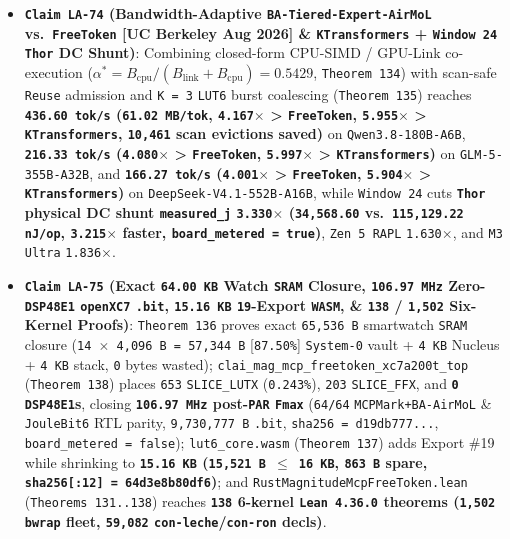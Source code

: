 \documentclass[10pt]{article}
\begin{document}
\begin{itemize}
  \item \textbf{\texttt{Claim LA-74} (Bandwidth-Adaptive \texttt{BA-Tiered-Expert-AirMoL} vs.\ \texttt{FreeToken} [UC Berkeley Aug 2026] \& \texttt{KTransformers} + \texttt{Window 24} \texttt{Thor} DC Shunt)}: Combining closed-form CPU-SIMD / GPU-Link co-execution ($\alpha^* = B_{\text{cpu}} / (B_{\text{link}} + B_{\text{cpu}}) = 0.5429$, \texttt{Theorem 134}) with scan-safe \texttt{Reuse} admission and \texttt{K = 3} \texttt{LUT6} burst coalescing (\texttt{Theorem 135}) reaches \textbf{\texttt{436.60 tok/s} (\texttt{61.02 MB/tok}, \texttt{4.167$\times$} > \texttt{FreeToken}, \texttt{5.955$\times$} > \texttt{KTransformers}, \texttt{10,461} scan evictions saved)} on \texttt{Qwen3.8-180B-A6B}, \textbf{\texttt{216.33 tok/s} (\texttt{4.080$\times$} > \texttt{FreeToken}, \texttt{5.997$\times$} > \texttt{KTransformers})} on \texttt{GLM-5-355B-A32B}, and \textbf{\texttt{166.27 tok/s} (\texttt{4.001$\times$} > \texttt{FreeToken}, \texttt{5.904$\times$} > \texttt{KTransformers})} on \texttt{DeepSeek-V4.1-552B-A16B}, while \texttt{Window 24} cuts \textbf{\texttt{Thor} physical DC shunt \texttt{measured\_j} \texttt{3.330$\times$} (\texttt{34,568.60} vs.\ \texttt{115,129.22 nJ/op}, \texttt{3.215$\times$} faster, \texttt{board\_metered = true})}, \texttt{Zen 5 RAPL} \texttt{1.630$\times$}, and \texttt{M3 Ultra} \texttt{1.836$\times$}.
  \item \textbf{\texttt{Claim LA-75} (Exact \texttt{64.00 KB} Watch \texttt{SRAM} Closure, \texttt{106.97 MHz} Zero-\texttt{DSP48E1} \texttt{openXC7} \texttt{.bit}, \texttt{15.16 KB} \texttt{19}-Export \texttt{WASM}, \& \texttt{138} / \texttt{1,502} Six-Kernel Proofs)}: \texttt{Theorem 136} proves exact \texttt{65,536 B} smartwatch \texttt{SRAM} closure (\texttt{14 $\times$ 4,096 B = 57,344 B} [\texttt{87.50\%}] \texttt{System-0} vault + \texttt{4 KB} Nucleus + \texttt{4 KB} stack, \texttt{0} bytes wasted); \texttt{clai\_mag\_mcp\_freetoken\_xc7a200t\_top} (\texttt{Theorem 138}) places \texttt{653} \texttt{SLICE\_LUTX} (\texttt{0.243\%}), \texttt{203} \texttt{SLICE\_FFX}, and \textbf{\texttt{0} \texttt{DSP48E1}s}, closing \textbf{\texttt{106.97 MHz} post-\texttt{PAR} \texttt{Fmax}} (\texttt{64/64} \texttt{MCPMark+BA-AirMoL} \& \texttt{JouleBit6} RTL parity, \texttt{9,730,777 B} \texttt{.bit}, \texttt{sha256 = d19db777...}, \texttt{board\_metered = false}); \texttt{lut6\_core.wasm} (\texttt{Theorem 137}) adds Export \#19 while shrinking to \textbf{\texttt{15.16 KB} (\texttt{15,521 B $\le$ 16 KB}, \texttt{863 B} spare, \texttt{sha256[:12] = 64d3e8b80df6})}; and \texttt{RustMagnitudeMcpFreeToken.lean} (\texttt{Theorems 131..138}) reaches \textbf{\texttt{138} 6-kernel \texttt{Lean 4.36.0} theorems (\texttt{1,502} \texttt{bwrap} fleet, \texttt{59,082} \texttt{con-leche}/\texttt{con-ron} decls)}.
\end{itemize}
\end{document}
